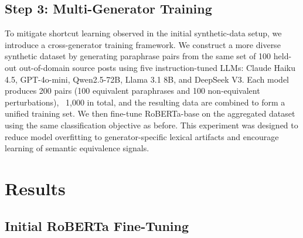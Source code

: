 \documentclass[10pt,conference,compsocconf]{IEEEtran}
\begin{document}
\subsection{Step 3: Multi-Generator Training}

To mitigate shortcut learning observed in the initial synthetic-data setup, we introduce a cross-generator training framework. We construct a more diverse synthetic dataset by generating paraphrase pairs from the same set of 100 held-out out-of-domain source posts using five instruction-tuned LLMs: Claude Haiku 4.5, GPT-4o-mini, Qwen2.5-72B, Llama 3.1 8B, and DeepSeek V3. Each model produces 200 pairs (100 equivalent paraphrases and 100 non-equivalent perturbations), ~1,000 in total, and the resulting data are combined to form a unified training set. We then fine-tune RoBERTa-base on the aggregated dataset using the same classification objective as before. This experiment was designed to reduce model overfitting to generator-specific lexical artifacts and encourage learning of semantic equivalence signals.


\section{Results}


\subsection{Initial RoBERTa Fine-Tuning}
\end{document}
